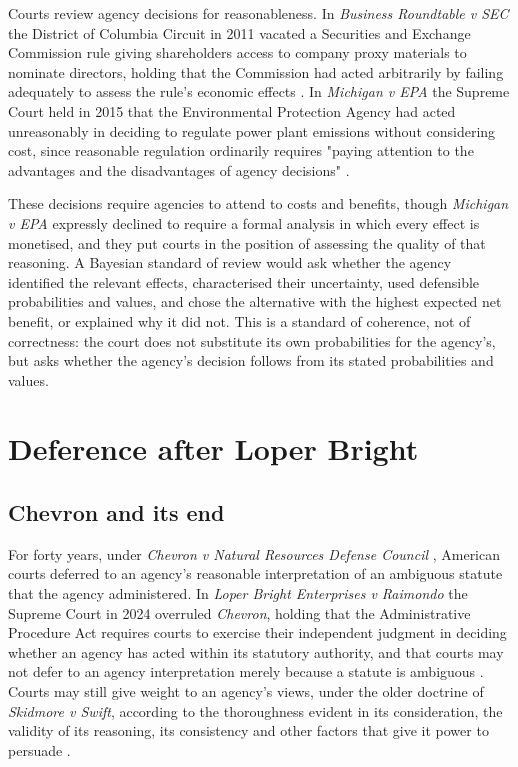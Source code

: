 Courts review agency decisions for reasonableness. In \emph{Business Roundtable v SEC} the District of Columbia Circuit in 2011 vacated a Securities and Exchange Commission rule giving shareholders access to company proxy materials to nominate directors, holding that the Commission had acted arbitrarily by failing adequately to assess the rule's economic effects \citep{businessroundtable2011}. In \emph{Michigan v EPA} the Supreme Court held in 2015 that the Environmental Protection Agency had acted unreasonably in deciding to regulate power plant emissions without considering cost, since reasonable regulation ordinarily requires "paying attention to the advantages and the disadvantages of agency decisions" \citep{michiganepa2015}.

These decisions require agencies to attend to costs and benefits, though \emph{Michigan v EPA} expressly declined to require a formal analysis in which every effect is monetised, and they put courts in the position of assessing the quality of that reasoning. A Bayesian standard of review would ask whether the agency identified the relevant effects, characterised their uncertainty, used defensible probabilities and values, and chose the alternative with the highest expected net benefit, or explained why it did not. This is a standard of coherence, not of correctness: the court does not substitute its own probabilities for the agency's, but asks whether the agency's decision follows from its stated probabilities and values.

\section{Deference after Loper Bright}

\subsection{Chevron and its end}

For forty years, under \emph{Chevron v Natural Resources Defense Council} \citep{chevron1984}, American courts deferred to an agency's reasonable interpretation of an ambiguous statute that the agency administered. In \emph{Loper Bright Enterprises v Raimondo} the Supreme Court in 2024 overruled \emph{Chevron}, holding that the Administrative Procedure Act requires courts to exercise their independent judgment in deciding whether an agency has acted within its statutory authority, and that courts may not defer to an agency interpretation merely because a statute is ambiguous \citep{loperbright2024}. Courts may still give weight to an agency's views, under the older doctrine of \emph{Skidmore v Swift}, according to the thoroughness evident in its consideration, the validity of its reasoning, its consistency and other factors that give it power to persuade \citep{skidmore1944}.

